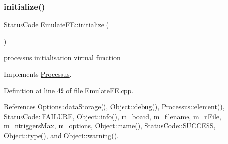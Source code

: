 \subsubsection{\texorpdfstring{initialize()}{initialize()}}
{\footnotesize\ttfamily \hyperlink{classStatusCode}{Status\+Code} Emulate\+F\+E\+::initialize (\begin{DoxyParamCaption}{ }\end{DoxyParamCaption})\hspace{0.3cm}{\ttfamily [virtual]}}

processus initialisation virtual function 

Implements \hyperlink{classProcessus_aee88ad7b77ae7319cf8b128e9dd2ea11}{Processus}.



Definition at line 49 of file Emulate\+F\+E.\+cpp.



References Options\+::data\+Storage(), Object\+::debug(), Processus\+::element(), Status\+Code\+::\+F\+A\+I\+L\+U\+RE, Object\+::info(), m\+\_\+board, m\+\_\+filename, m\+\_\+n\+File, m\+\_\+ntriggers\+Max, m\+\_\+options, Object\+::name(), Status\+Code\+::\+S\+U\+C\+C\+E\+SS, Object\+::type(), and Object\+::warning().


